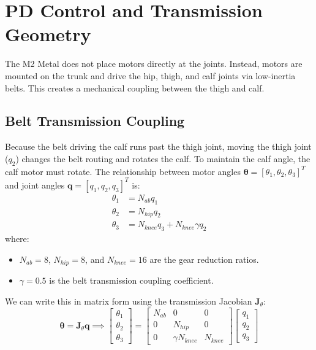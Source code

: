 \documentclass[11pt,a4paper]{article}
\begin{document}
\section{PD Control and Transmission Geometry}
The M2 Metal does not place motors directly at the joints. Instead, motors are mounted on the trunk and drive the hip, thigh, and calf joints via low-inertia belts. This creates a mechanical coupling between the thigh and calf.

\subsection{Belt Transmission Coupling}
Because the belt driving the calf runs past the thigh joint, moving the thigh joint ($q_2$) changes the belt routing and rotates the calf. To maintain the calf angle, the calf motor must rotate. The relationship between motor angles $\mathbf{\theta} = [\theta_1, \theta_2, \theta_3]^T$ and joint angles $\mathbf{q} = [q_1, q_2, q_3]^T$ is:
\begin{align}
\theta_1 &= N_{ab} q_1 \\
\theta_2 &= N_{hip} q_2 \\
\theta_3 &= N_{knee} q_3 + N_{knee} \gamma q_2
\end{align}
where:
\begin{itemize}
    \item $N_{ab} = 8$, $N_{hip} = 8$, and $N_{knee} = 16$ are the gear reduction ratios.
    \item $\gamma = 0.5$ is the belt transmission coupling coefficient.
\end{itemize}

We can write this in matrix form using the transmission Jacobian $\mathbf{J}_{\theta}$:
\begin{equation}
\mathbf{\theta} = \mathbf{J}_{\theta} \mathbf{q} \implies \begin{bmatrix} \theta_1 \\ \theta_2 \\ \theta_3 \end{bmatrix} = \begin{bmatrix} N_{ab} & 0 & 0 \\ 0 & N_{hip} & 0 \\ 0 & \gamma N_{knee} & N_{knee} \end{bmatrix} \begin{bmatrix} q_1 \\ q_2 \\ q_3 \end{bmatrix}
\end{equation}
\end{document}
